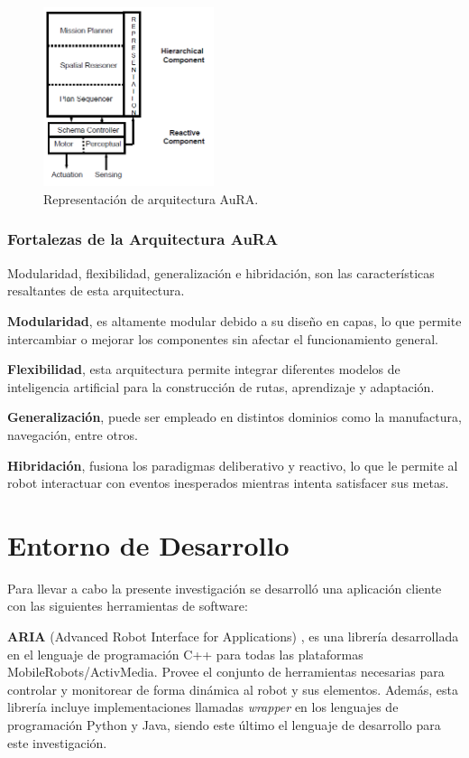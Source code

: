 \documentclass[11pt,twoside,A5]{article}
\begin{document}
\begin{figure}[here]
\begin{center}
\includegraphics[width=5cm]{aura.png} 
\caption{Representación de arquitectura AuRA.}
\label{fig:aura}
\end{center}
\end{figure} 

\subsubsection*{Fortalezas de la Arquitectura AuRA}

Modularidad, flexibilidad, generalización e hibridación, son las características resaltantes de esta arquitectura.

\textbf{Modularidad}, es altamente modular debido a su diseño en capas, lo que permite intercambiar o mejorar
los componentes sin afectar el funcionamiento general.

\textbf{Flexibilidad}, esta arquitectura permite integrar diferentes modelos de inteligencia artificial 
para la construcción de rutas, aprendizaje y adaptación. 

\textbf{Generalización}, puede ser empleado en distintos dominios como la manufactura, navegación, entre otros.

\textbf{Hibridación}, fusiona los paradigmas deliberativo y reactivo, lo que le permite al robot interactuar con eventos inesperados mientras intenta satisfacer sus metas.

\section*{Entorno de Desarrollo}

Para llevar a cabo la presente investigación se desarrolló una aplicación cliente
con las siguientes herramientas de software:

\textbf{ARIA} (Advanced Robot Interface for Applications) \cite{aria2014},
es una librería desarrollada en el lenguaje de programación C++ para todas las
plataformas MobileRobots/ActivMedia. Provee el conjunto de herramientas necesarias
para controlar y monitorear de forma dinámica al robot y sus elementos. Además, esta librería
incluye implementaciones llamadas \textit{wrapper} en los lenguajes de programación Python y Java, siendo este último 
el lenguaje de desarrollo para este investigación.
\end{document}
